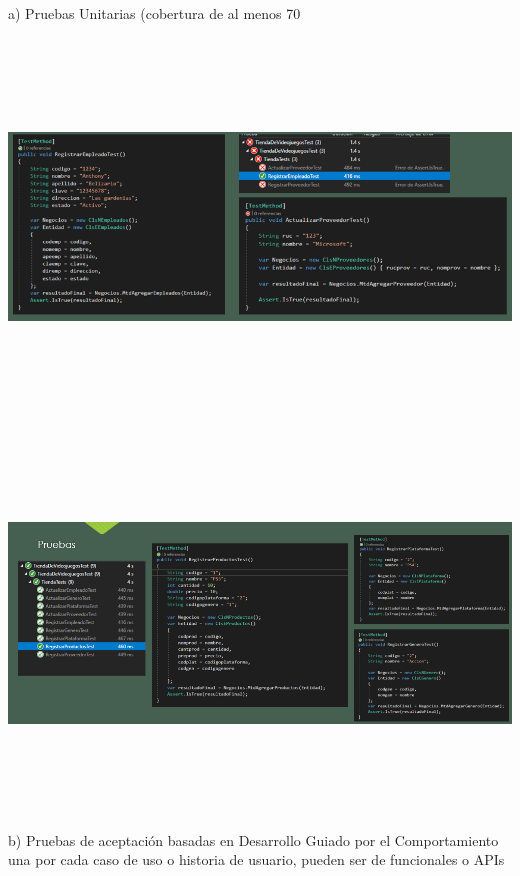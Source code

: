 \documentclass[12pt,letterpaper]{article}
\begin{document}
a) Pruebas Unitarias (cobertura de al menos 70%
\begin{center}
    \includegraphics[width=18cm, height=10cm]{img/test1.png}  
\end{center}
\begin{center}
    \includegraphics[width=18cm, height=10cm]{img/tes2.png}  
\end{center}
b) Pruebas de aceptación basadas en Desarrollo Guiado por el Comportamiento una por cada caso de uso o historia de usuario, pueden ser de funcionales o APIs
\end{document}
